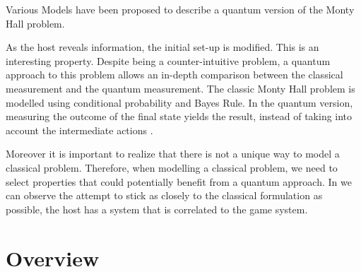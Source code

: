 Various Models have been proposed to describe a quantum version of the Monty Hall problem\cite{Gill}\cite{Flitney2008}.

As the host reveals information, the initial set-up is modified. This is an interesting property. Despite being a counter-intuitive problem, a quantum approach to this problem allows an in-depth comparison between the classical measurement and the quantum measurement. The classic Monty Hall problem is modelled using conditional probability and Bayes Rule. In the quantum version, measuring the outcome of the final state yields the result, instead of taking into account the intermediate actions \cite{Fra2011}.

Moreover it is important to realize that there is not a unique way to model a classical problem\cite{Gill2002}. Therefore, when modelling a classical problem, we need to select properties that could potentially benefit from a quantum approach. In \cite{Gill2002} we can observe the attempt to stick as closely to the classical formulation as possible, the host has a system that is correlated to the game system.


\section{Overview}
\label{sec:related_work_overview}






